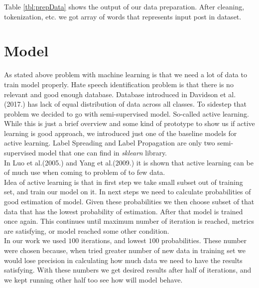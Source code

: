 \documentclass[10pt, a4paper]{article}
\begin{document}
Table \ref{tbl:prepData} shows the output of our data preparation. After cleaning, tokenization, etc. we got array of words that represents input post in dataset.

\section{Model}
As stated above problem with machine learning is that we need a lot of data to train model properly. Hate speech identification problem is that there is no relevant and good enough database. Database introduced in Davidson et al.(2017.) has lack of equal distribution of data across all classes. To sidestep that problem we decided to go with semi-supervised model. So-called active learning.
\\While this is just a brief overview and some kind of prototype to show us if active learning is good approach, we introduced just one of the baseline models for active learning. Label Spreading and Label Propagation are only two semi-supervised model that one can find in \textit{sklearn} library.
\\In Luo et al.(2005.) and Yang et al.(2009.) it is shown that active learning can be of much use when coming to problem of to few data.
\\Idea of active learning is that in first step we take small subset out of training set, and train our model on it. In next steps we need to calculate probabilities of good estimation of model. Given these probabilities we then choose subset of that data that has the lowest probability of estimation. After that model is trained once again. This continues until maximum number of iteration is reached, metrics are satisfying, or model reached some other condition.
\\In our work we used $100$ iterations, and lowest $100$ probabilities. These number were chosen because, when tried greater number of new data in training set we would lose precision in calculating how much data we need to have the results satisfying. With these numbers we get desired results after half of iterations, and we kept running other half too see how will model behave.
\end{document}
